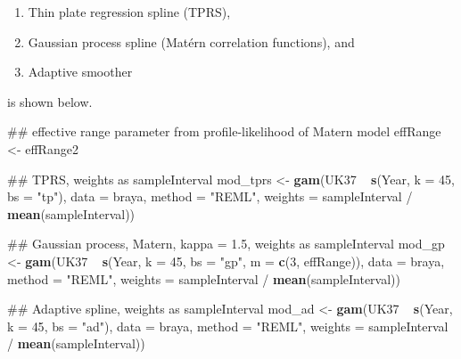 \documentclass[12pt,]{article}
\newenvironment{Shaded}{\begin{snugshade}}{\end{snugshade}}
\newcommand{\KeywordTok}[1]{\textcolor[rgb]{0.13,0.29,0.53}{\textbf{{#1}}}}
\newcommand{\DataTypeTok}[1]{\textcolor[rgb]{0.13,0.29,0.53}{{#1}}}
\newcommand{\DecValTok}[1]{\textcolor[rgb]{0.00,0.00,0.81}{{#1}}}
\newcommand{\StringTok}[1]{\textcolor[rgb]{0.31,0.60,0.02}{{#1}}}
\newcommand{\NormalTok}[1]{{#1}}
\providecommand{\tightlist}{%
  \setlength{\itemsep}{0pt}\setlength{\parskip}{0pt}}
\begin{document}
\begin{enumerate}
\def\labelenumi{\arabic{enumi}.}
\tightlist
\item
  Thin plate regression spline (TPRS),
\item
  Gaussian process spline (Matérn correlation functions), and
\item
  Adaptive smoother
\end{enumerate}

is shown below.

\begin{Shaded}
\begin{Highlighting}[]
\NormalTok{## effective range parameter from profile-likelihood of Matern model}
\NormalTok{effRange <-}\StringTok{ }\NormalTok{effRange2}

\NormalTok{## TPRS, weights as sampleInterval}
\NormalTok{mod_tprs <-}\StringTok{ }\KeywordTok{gam}\NormalTok{(UK37 ~}\StringTok{ }\KeywordTok{s}\NormalTok{(Year, }\DataTypeTok{k =} \DecValTok{45}\NormalTok{, }\DataTypeTok{bs =} \StringTok{"tp"}\NormalTok{), }\DataTypeTok{data =} \NormalTok{braya,}
                \DataTypeTok{method =} \StringTok{"REML"}\NormalTok{,}
                \DataTypeTok{weights =} \NormalTok{sampleInterval /}\StringTok{ }\KeywordTok{mean}\NormalTok{(sampleInterval))}

\NormalTok{## Gaussian process, Matern, kappa = 1.5, weights as sampleInterval}
\NormalTok{mod_gp <-}\StringTok{ }\KeywordTok{gam}\NormalTok{(UK37 ~}\StringTok{ }\KeywordTok{s}\NormalTok{(Year, }\DataTypeTok{k =} \DecValTok{45}\NormalTok{, }\DataTypeTok{bs =} \StringTok{"gp"}\NormalTok{, }\DataTypeTok{m =} \KeywordTok{c}\NormalTok{(}\DecValTok{3}\NormalTok{, effRange)),}
              \DataTypeTok{data =} \NormalTok{braya,}
              \DataTypeTok{method =} \StringTok{"REML"}\NormalTok{,}
              \DataTypeTok{weights =} \NormalTok{sampleInterval /}\StringTok{ }\KeywordTok{mean}\NormalTok{(sampleInterval))}

\NormalTok{## Adaptive spline, weights as sampleInterval}
\NormalTok{mod_ad <-}\StringTok{ }\KeywordTok{gam}\NormalTok{(UK37 ~}\StringTok{ }\KeywordTok{s}\NormalTok{(Year, }\DataTypeTok{k =} \DecValTok{45}\NormalTok{, }\DataTypeTok{bs =} \StringTok{"ad"}\NormalTok{), }\DataTypeTok{data =} \NormalTok{braya,}
              \DataTypeTok{method =} \StringTok{"REML"}\NormalTok{,}
              \DataTypeTok{weights =} \NormalTok{sampleInterval /}\StringTok{ }\KeywordTok{mean}\NormalTok{(sampleInterval))}
\end{Highlighting}
\end{Shaded}
\end{document}
